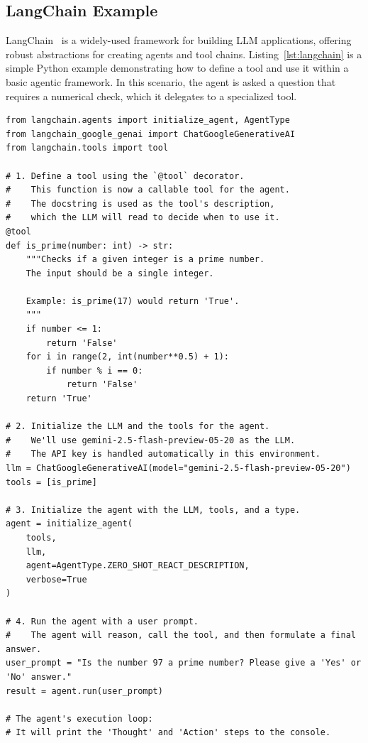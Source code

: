 \subsection{LangChain Example}
LangChain~\citep{Chase_LangChain_2022} is a widely-used framework for building LLM applications, offering robust abstractions for creating agents and tool chains. Listing~\ref{lst:langchain} is a simple Python example demonstrating how to define a tool and use it within a basic agentic framework. In this scenario, the agent is asked a question that requires a numerical check, which it delegates to a specialized tool.
\begin{listing}
\begin{verbatim}
from langchain.agents import initialize_agent, AgentType
from langchain_google_genai import ChatGoogleGenerativeAI
from langchain.tools import tool

# 1. Define a tool using the `@tool` decorator.
#    This function is now a callable tool for the agent.
#    The docstring is used as the tool's description,
#    which the LLM will read to decide when to use it.
@tool
def is_prime(number: int) -> str:
    """Checks if a given integer is a prime number.
    The input should be a single integer.
    
    Example: is_prime(17) would return 'True'.
    """
    if number <= 1:
        return 'False'
    for i in range(2, int(number**0.5) + 1):
        if number % i == 0:
            return 'False'
    return 'True'

# 2. Initialize the LLM and the tools for the agent.
#    We'll use gemini-2.5-flash-preview-05-20 as the LLM.
#    The API key is handled automatically in this environment.
llm = ChatGoogleGenerativeAI(model="gemini-2.5-flash-preview-05-20")
tools = [is_prime]

# 3. Initialize the agent with the LLM, tools, and a type.
agent = initialize_agent(
    tools,
    llm,
    agent=AgentType.ZERO_SHOT_REACT_DESCRIPTION,
    verbose=True
)

# 4. Run the agent with a user prompt.
#    The agent will reason, call the tool, and then formulate a final answer.
user_prompt = "Is the number 97 a prime number? Please give a 'Yes' or 'No' answer."
result = agent.run(user_prompt)

# The agent's execution loop:
# It will print the 'Thought' and 'Action' steps to the console.
\end{verbatim}
    \caption{Example on how to use LangChain to define a tool and use it with an agent.}\label{lst:langchain}
\end{listing}

